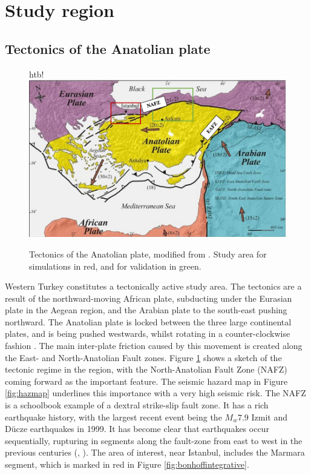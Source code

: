 \documentclass[../Text/00main.tex]{subfiles}
\begin{document}
\section{Study region} \label{CH1sec:Tectonics}

\subsection{Tectonics of the Anatolian plate}

\begin{figure}{htb!}
    \centering
    \includegraphics[width=.5\textwidth]{images_methods/tectonicsetting_turkey.png}
    \caption{Tectonics of the Anatolian plate, modified from \citep{caglayanmapping}. Study area for simulations in red, and for validation in green.}
    \label{fig:tectonicsetting}
\end{figure}


Western Turkey constitutes a tectonically active study area. The tectonics are a result of the northward-moving African plate, subducting under the Eurasian plate in the Aegean region, and the Arabian plate to the south-east pushing northward. The Anatolian plate is locked between the three large continental plates, and is being pushed westwards, whilst rotating in a counter-clockwise fashion \citep{rotstein1984counterclockwise}. The main inter-plate friction caused by this movement is created along the East- and North-Anatolian Fault zones. Figure \ref{fig:tectonicsetting} shows a sketch of the tectonic regime in the region, with the North-Anatolian Fault Zone (NAFZ) coming forward as the important feature. The seismic hazard map in Figure \ref{fig:hazmap} underlines this importance with a very high seismic risk. The NAFZ is a schoolbook example of a dextral strike-slip fault zone. It has a rich earthquake history, with the largest recent event being the $M_w 7.9$ Izmit and Dücze earthquakes in 1999. It has become clear that earthquakes occur sequentially, rupturing in segments along the fault-zone from east to west in the previous centuries (\cite{bohnhoff_earthquake_2013}, \cite{bulut_magnitudes_2019}). The area of interest, near Istanbul, includes the Marmara segment, which is marked in red in Figure \ref{fig:bonhoffintegrative}.
\end{document}
